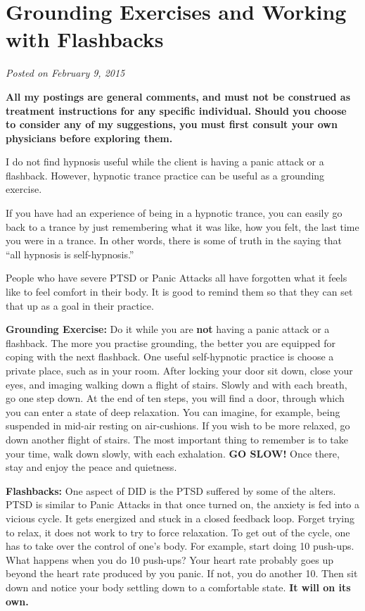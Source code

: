 \documentclass[]{book}
\begin{document}
\hypertarget{grounding-exercises-and-working-with-flashbacks}{%
\section{Grounding Exercises and Working with Flashbacks}\label{grounding-exercises-and-working-with-flashbacks}}

\emph{Posted on February 9, 2015}

\textbf{All my postings are general comments, and must not be construed as treatment instructions for any specific individual. Should you choose to consider any of my suggestions, you must first consult your own physicians before exploring them.}

I do not find hypnosis useful while the client is having a panic attack or a flashback. However, hypnotic trance practice can be useful as a grounding exercise.

If you have had an experience of being in a hypnotic trance, you can easily go back to a trance by just remembering what it was like, how you felt, the last time you were in a trance. In other words, there is some of truth in the saying that ``all hypnosis is self-hypnosis.''

People who have severe PTSD or Panic Attacks all have forgotten what it feels like to feel comfort in their body. It is good to remind them so that they can set that up as a goal in their practice.

\textbf{Grounding Exercise:} Do it while you are \textbf{not} having a panic attack or a flashback. The more you practise grounding, the better you are equipped for coping with the next flashback. One useful self-hypnotic practice is choose a private place, such as in your room. After locking your door sit down, close your eyes, and imaging walking down a flight of stairs. Slowly and with each breath, go one step down. At the end of ten steps, you will find a door, through which you can enter a state of deep relaxation. You can imagine, for example, being suspended in mid-air resting on air-cushions. If you wish to be more relaxed, go down another flight of stairs. The most important thing to remember is to take your time, walk down slowly, with each exhalation. \textbf{GO SLOW!} Once there, stay and enjoy the peace and quietness.

\textbf{Flashbacks:} One aspect of DID is the PTSD suffered by some of the alters. PTSD is similar to Panic Attacks in that once turned on, the anxiety is fed into a vicious cycle. It gets energized and stuck in a closed feedback loop. Forget trying to relax, it does not work to try to force relaxation. To get out of the cycle, one has to take over the control of one's body. For example, start doing 10 push-ups. What happens when you do 10 push-ups? Your heart rate probably goes up beyond the heart rate produced by you panic. If not, you do another 10. Then sit down and notice your body settling down to a comfortable state. \textbf{It will on its own.}
\end{document}

